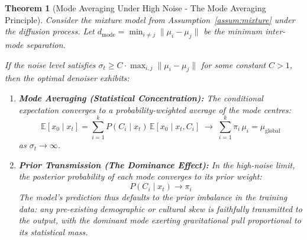 \documentclass[11pt]{article}
\newtheorem{theorem}{Theorem}[section]
\begin{document}
\begin{theorem}[Mode Averaging Under High Noise - The Mode Averaging Principle]\label{thm:MAP}
Consider the mixture model from Assumption~\ref{assum:mixture} under the diffusion process. Let $d_{\mathrm{mode}} = \min_{i \neq j} \|\mu_i - \mu_j\|$ be the minimum inter-mode separation.

If the noise level satisfies $\sigma_t \geq C \cdot \max_{i,j} \|\mu_i - \mu_j\|$ for some constant $C > 1$, then the optimal denoiser exhibits:

\begin{enumerate}
 \item \textbf{Mode Averaging (Statistical Concentration):} The conditional expectation converges to a probability-weighted average of the mode centres:
 $$\mathbb{E}[x_0 \mid x_t] = \sum_{i=1}^k P(C_i \mid x_t)\, \mathbb{E}[x_0 \mid x_t, C_i] \;\longrightarrow\; \sum_{i=1}^k \pi_i\, \mu_i = \mu_{\mathrm{global}}$$
 as $\sigma_t \to \infty$.

 \item \textbf{Prior Transmission (The Dominance Effect):} In the high-noise limit, the posterior probability of each mode converges to its prior weight:
 $$P(C_i \mid x_t) \to \pi_i$$
 The model's prediction thus defaults to the prior imbalance in the training data: any pre-existing demographic or cultural skew is faithfully transmitted to the output, with the dominant mode exerting gravitational pull proportional to its statistical mass.
\end{enumerate}
\end{theorem}
\end{document}

